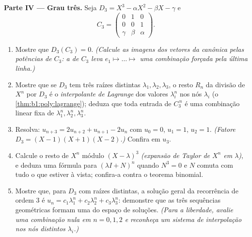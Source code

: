 \begin{problem}
\medskip
\noindent\textbf{Parte IV --- Grau três.} Seja $D_3 = X^3 -
\alpha X^2 - \beta X - \gamma$ e
\[
C_3 = \begin{pmatrix} 0 & 1 & 0\\ 0 & 0 & 1\\ \gamma & \beta &
\alpha \end{pmatrix}.
\]
\begin{enumerate}[resume]
  \item Mostre que $D_3(C_3) = 0$. \emph{(Calcule as imagens dos vetores da
         canônica pelas potências de $C_3$: a  de
        $C_3$ leva $e_1 \mapsto \dots \mapsto$ uma combinação forçada pela última
        linha.)}
  \item Mostre que se $D_3$ tem três raízes distintas $\lambda_1,
        \lambda_2, \lambda_3$, o
        resto $R_n$ da divisão de $X^n$ por $D_3$ é o
        \emph{interpolante de Lagrange} dos valores $\lambda_i^n$ nos nós
        $\lambda_i$ (o \cref{thm:b1:poly:lagrange}); deduza que toda entrada de $C_3^{\,n}$ é uma
        combinação linear fixa de $\lambda_1^n, \lambda_2^n, \lambda_3^n$.
  \item Resolva: $u_{n+3} = 2u_{n+2} + u_{n+1} - 2u_n$ com $u_0 =
        0$, $u_1 = 1$, $u_2 = 1$.
        \emph{(Fatore $D_3 = (X - 1)(X
        + 1)(X - 2)$.)} Confira em $u_3$.
  \item Calcule o resto de $X^n$ módulo $(X -
        \lambda)^3$ \emph{(expansão de
        Taylor de $X^n$ em $\lambda$)}, e deduza uma fórmula para
        $(\lambda I +
        N)^n$ quando $N^3 = 0$ e $N$ comuta com tudo o que estiver
        à vista; confira-a contra o teorema binomial.
  \item Mostre que, para $D_3$ com raízes distintas, a solução
        geral da recorrência de ordem $3$ é $u_n = c_1
        \lambda_1^n + c_2\lambda_2^n + c_3\lambda_3^n$: demonstre que
        as três sequências geométricas formam uma  do espaço de
        soluções. \emph{(Para a liberdade, avalie uma combinação
        nula em $n = 0, 1, 2$ e reconheça um sistema de interpolação nos
        nós distintos $\lambda_i$.)}
\end{enumerate}


\end{problem}
